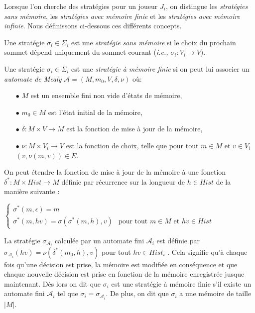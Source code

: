 Lorsque l'on cherche des stratégies pour un joueur $J_{i}$, on distingue les \textit{stratégies sans mémoire}, les \textit{stratégies avec mémoire finie} et les \textit{stratégies avec mémoire infinie}. Nous définissons ci-dessous ces différents concepts.

\begin{defi}
	
	Une stratégie $\sigma _{i} \in \Sigma _{i}$ est une \textit{stratégie sans mémoire} si le choix du prochain sommet dépend uniquement du sommet courant (\emph{i.e.,} $\sigma _{i}: V_{i} \rightarrow V$).
\end{defi}

\begin{defi}
	
	Une stratégie $\sigma _{i} \in \Sigma _{i}$ est une \textit{stratégie à mémoire finie} si on peut lui associer un \textit{automate de Mealy} \linebreak$\mathcal{A} = (M, m_{0}, V, \delta, \nu)$ où:
	\begin{enumerate}
		\item[$\bullet$] $M$ est un ensemble fini non vide d'états de mémoire,
		\item[$\bullet$] $m_{0} \in M$ est l'état initial de la mémoire,
		\item[$\bullet$] $\delta : M \times V \rightarrow M$ est la fonction de mise à jour de la mémoire,
		\item[$\bullet$] $ \nu: M \times V_{i} \rightarrow V$ est la fonction de choix, telle que pour tout $m \in M$ et $v\in V_{i}$ $(v, \nu(m,v))\in E$.\end{enumerate}
		
		On peut étendre la fonction de mise à jour de la mémoire à une fonction $\delta ^{*}: M \times Hist \rightarrow M$ définie par récurrence sur la longueur de $h \in Hist$ de la manière suivante :\\\begin{center}
		 $\begin{cases}
																	\sigma^{*}(m,\epsilon) = m	\\
																	\sigma^{*}(m,hv)=\sigma(\sigma^{*}(m,h),v) & \text{pour tout } m\in M \text{ et } hv\in Hist
																	\end{cases}$ \end{center}
																	
		La stratégie $\sigma _{\mathcal{A}_{i}}$ calculée par un automate fini $\mathcal{A}_{i}$ est définie  par\\
 $\sigma _{\mathcal{A}_{i}}(hv) = \nu(\delta^{*}(m_{0},h),v)$ pour tout $hv \in Hist_{i}$ . Cela signifie qu'à chaque fois qu'une décision est prise, la mémoire est modifiée en conséquence et que chaque nouvelle décision est prise en fonction de la mémoire enregistrée jusque maintenant.
		Dès lors on dit que $\sigma _{i}$ est une stratégie à mémoire finie s'il existe un automate fini $\mathcal{A}_{i}$ tel que $\sigma _{i} = \sigma _{\mathcal{A}_{i}}$. De plus, on dit que $\sigma_i$ a une mémoire de taille $|M|$.

\end{defi}

